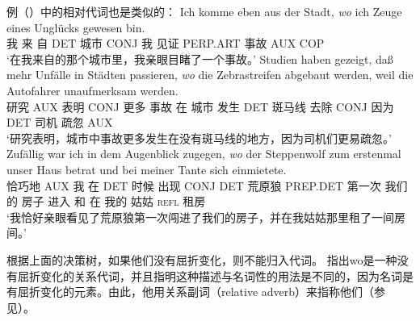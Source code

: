 例（）中的相对代词也是类似的：
\eal
\ex 
\gll Ich komme eben aus der Stadt, \emph{wo} ich Zeuge eines Unglücks gewesen bin.\footnotemark\\
	 我 来 \particle{} 自 DET 城市 CONJ 我 见证 PERP.ART 事故 AUX COP \\
\label{bsp-wo-ich-zeuge}
\glt `在我来自的那个城市里，我亲眼目睹了一个事故。'
\ex 
\gll Studien haben gezeigt, daß mehr Unfälle in Städten passieren, \emph{wo} die Zebrastreifen abgebaut werden, weil die Autofahrer unaufmerksam werden.\footnotemark\\
     研究 AUX 表明 CONJ 更多 事故 在 城市 发生 DET 斑马线 去除 CONJ 因为 DET 司机 疏忽 AUX\\
\glt `研究表明，城市中事故更多发生在没有斑马线的地方，因为司机们更易疏忽。'
\ex 
\gll Zufällig war ich in dem Augenblick zugegen, \emph{wo} der Steppenwolf zum erstenmal unser Haus betrat und bei meiner Tante sich einmietete.\footnotemark\\
	 恰巧地 AUX 我 在 DET 时候 出现 CONJ DET 荒原狼 PREP.DET 第一次 我们的 房子 进入 和 在 我的 姑姑 \textsc{refl} 租房\\

\glt `我恰好亲眼看见了荒原狼第一次闯进了我们的房子，并在我姑姑那里租了一间房间。'
\zl

根据上面的决策树，如果他们没有屈折变化，则不能归入代词。\citet[]{Eisenberg2004a} 指出wo是一种没有屈折变化的关系代词，并且指明这种描述与名词性的用法是不同的，因为名词是有屈折变化的元素。由此，他用关系副词（relative adverb）来指称他们（参见）。

